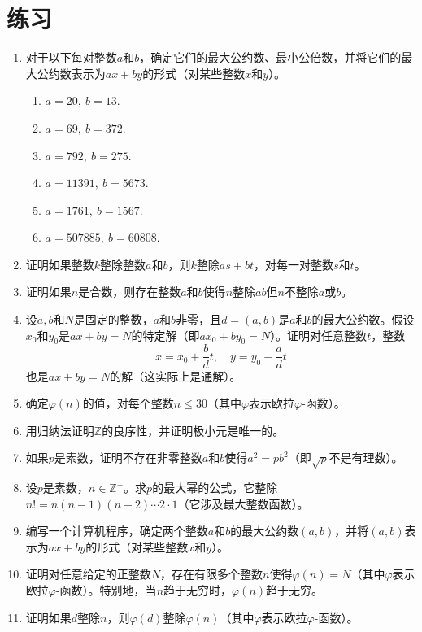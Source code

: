 \section*{练习}
\begin{enumerate}
\item 对于以下每对整数$a$和$b$，确定它们的最大公约数、最小公倍数，并将它们的最大公约数表示为$ax + by$的形式（对某些整数$x$和$y$）。
\begin{enumerate}
\item $a = 20, \ b = 13$.
\item $a = 69, \ b = 372$.
\item $a = 792, \ b = 275$.
\item $a = 11391, \ b = 5673$.
\item $a = 1761, \ b = 1567$.
\item $a = 507885, \ b = 60808$.
\end{enumerate}
\item 证明如果整数$k$整除整数$a$和$b$，则$k$整除$as + bt$，对每一对整数$s$和$t$。
\item 证明如果$n$是合数，则存在整数$a$和$b$使得$n$整除$ab$但$n$不整除$a$或$b$。
\item 设$a, b$和$N$是固定的整数，$a$和$b$非零，且$d = (a, b)$是$a$和$b$的最大公约数。假设$x_0$和$y_0$是$ax + by = N$的特定解（即$ax_0 + by_0 = N$）。证明对任意整数$t$，整数
\[
x = x_0 + \frac{b}{d} t, \quad y = y_0 - \frac{a}{d} t
\]
也是$ax + by = N$的解（这实际上是通解）。
\item 确定$\varphi(n)$的值，对每个整数$n \leq 30$（其中$\varphi$表示欧拉$\varphi$-函数）。
\item 用归纳法证明$\mathbb{Z}$的良序性，并证明极小元是唯一的。
\item 如果$p$是素数，证明不存在非零整数$a$和$b$使得$a^2 = pb^2$（即$\sqrt{p}$不是有理数）。
\item 设$p$是素数，$n \in \mathbb{Z}^+$。求$p$的最大幂的公式，它整除$n! = n(n-1)(n-2) \cdots 2 \cdot 1$（它涉及最大整数函数）。
\item 编写一个计算机程序，确定两个整数$a$和$b$的最大公约数$(a, b)$，并将$(a, b)$表示为$ax + by$的形式（对某些整数$x$和$y$）。
\item 证明对任意给定的正整数$N$，存在有限多个整数$n$使得$\varphi(n) = N$（其中$\varphi$表示欧拉$\varphi$-函数）。特别地，当$n$趋于无穷时，$\varphi(n)$趋于无穷。
\item 证明如果$d$整除$n$，则$\varphi(d)$整除$\varphi(n)$（其中$\varphi$表示欧拉$\varphi$-函数）。
\end{enumerate}




